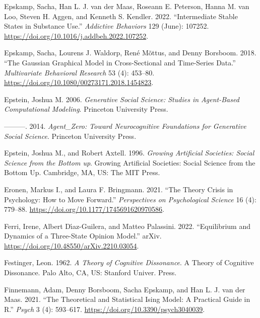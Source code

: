 \documentclass[
  a4paper,
  DIV=11,
  numbers=noendperiod,
  oneside]{scrreprt}
\newlength{\cslhangindent}
\newenvironment{CSLReferences}[2] %
 {\begin{list}{}{%
  \setlength{\itemindent}{0pt}
  \setlength{\leftmargin}{0pt}
  \setlength{\parsep}{0pt}
  \ifodd #1
   \setlength{\leftmargin}{\cslhangindent}
   \setlength{\itemindent}{-1\cslhangindent}
  \fi
  \setlength{\itemsep}{#2\baselineskip}}}
 {\end{list}}
\begin{document}
\begin{CSLReferences}{1}{0}
Epskamp, Sacha, Han L. J. van der Maas, Roseann E. Peterson, Hanna M.
van Loo, Steven H. Aggen, and Kenneth S. Kendler. 2022. {``Intermediate
Stable States in Substance Use.''} \emph{Addictive Behaviors} 129
(June): 107252. \url{https://doi.org/10.1016/j.addbeh.2022.107252}.

Epskamp, Sacha, Lourens J. Waldorp, René Mõttus, and Denny Borsboom.
2018. {``The {Gaussian Graphical Model} in {Cross-Sectional} and
{Time-Series Data}.''} \emph{Multivariate Behavioral Research} 53 (4):
453--80. \url{https://doi.org/10.1080/00273171.2018.1454823}.

Epstein, Joshua M. 2006. \emph{Generative {Social Science}: {Studies} in
{Agent-Based Computational Modeling}}. {Princeton University Press}.

---------. 2014. \emph{Agent\_{Zero}: {Toward Neurocognitive
Foundations} for {Generative Social Science}}. {Princeton University
Press}.

Epstein, Joshua M., and Robert Axtell. 1996. \emph{Growing Artificial
Societies: {Social} Science from the Bottom up}. Growing Artificial
Societies: {Social} Science from the Bottom Up. {Cambridge, MA, US}:
{The MIT Press}.

Eronen, Markus I., and Laura F. Bringmann. 2021. {``The {Theory Crisis}
in {Psychology}: {How} to {Move Forward}.''} \emph{Perspectives on
Psychological Science} 16 (4): 779--88.
\url{https://doi.org/10.1177/1745691620970586}.

Ferri, Irene, Albert Dı́az-Guilera, and Matteo Palassini. 2022.
{``Equilibrium and Dynamics of a Three-State Opinion Model.''} {arXiv}.
\url{https://doi.org/10.48550/arXiv.2210.03054}.

Festinger, Leon. 1962. \emph{A Theory of Cognitive Dissonance}. A Theory
of Cognitive Dissonance. {Palo Alto, CA, US}: {Stanford Univer. Press}.

Finnemann, Adam, Denny Borsboom, Sacha Epskamp, and Han L. J. van der
Maas. 2021. {``The Theoretical and Statistical Ising Model: A Practical
Guide in R.''} \emph{Psych} 3 (4): 593--617.
\url{https://doi.org/10.3390/psych3040039}.


\end{CSLReferences}
\end{document}
